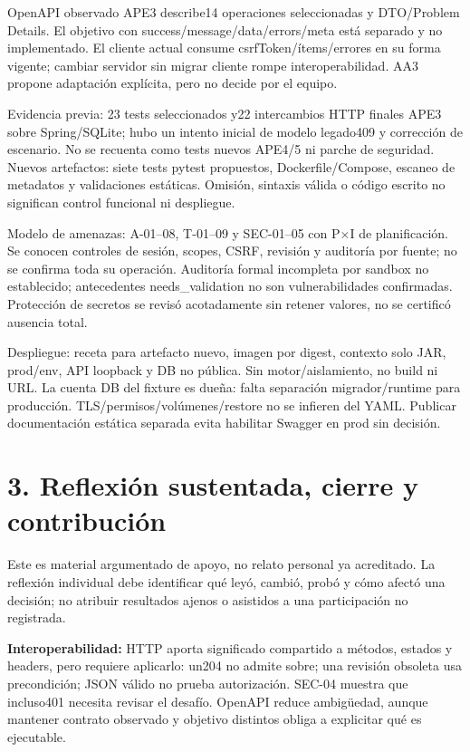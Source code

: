 \documentclass[12pt,a4paper]{report}
\begin{document}
OpenAPI observado APE3 describe14 operaciones seleccionadas y
DTO/Problem Details. El objetivo con success/message/data/errors/meta
está separado y no implementado. El cliente actual consume
csrfToken/ítems/errores en su forma vigente; cambiar servidor sin migrar
cliente rompe interoperabilidad. AA3 propone adaptación explícita, pero
no decide por el equipo.

Evidencia previa: 23 tests seleccionados y22 intercambios HTTP finales
APE3 sobre Spring/SQLite; hubo un intento inicial de modelo legado409 y
corrección de escenario. No se recuenta como tests nuevos APE4/5 ni
parche de seguridad. Nuevos artefactos: siete tests pytest propuestos,
Dockerfile/Compose, escaneo de metadatos y validaciones estáticas.
Omisión, sintaxis válida o código escrito no significan control
funcional ni despliegue.

Modelo de amenazas: A-01--08, T-01--09 y SEC-01--05 con P\ensuremath{\times}I de
planificación. Se conocen controles de sesión, scopes, CSRF, revisión y
auditoría por fuente; no se confirma toda su operación. Auditoría formal
incompleta por sandbox no establecido; antecedentes needs\_validation no
son vulnerabilidades confirmadas. Protección de secretos se revisó
acotadamente sin retener valores, no se certificó ausencia total.

Despliegue: receta para artefacto nuevo, imagen por digest, contexto
solo JAR, prod/env, API loopback y DB no pública. Sin motor/aislamiento,
no build ni URL. La cuenta DB del fixture es dueña: falta separación
migrador/runtime para producción. TLS/permisos/volúmenes/restore no se
infieren del YAML. Publicar documentación estática separada evita
habilitar Swagger en prod sin decisión.

\chapter{3. Reflexión sustentada, cierre y
contribución}\label{AA5-semana-5-3-reflexiuxf3n-sustentada-cierre-y-contribuciuxf3n}

Este es material argumentado de apoyo, no relato personal ya acreditado.
La reflexión individual debe identificar qué leyó, cambió, probó y cómo
afectó una decisión; no atribuir resultados ajenos o asistidos a una
participación no registrada.

\textbf{Interoperabilidad:} HTTP aporta significado compartido a
métodos, estados y headers, pero requiere aplicarlo: un204 no admite
sobre; una revisión obsoleta usa precondición; JSON válido no prueba
autorización. SEC-04 muestra que incluso401 necesita revisar el desafío.
OpenAPI reduce ambigüedad, aunque mantener contrato observado y objetivo
distintos obliga a explicitar qué es ejecutable.
\end{document}
